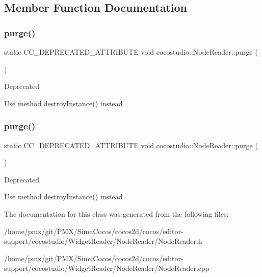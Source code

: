 \subsection{Member Function Documentation}
\mbox{\label{classcocostudio_1_1NodeReader_aac7a33c0697c91ac88c864f81f8813b3}} 
\subsubsection{\texorpdfstring{purge()}{purge()}\hspace{0.1cm}{\footnotesize\ttfamily [1/2]}}
{\footnotesize\ttfamily static C\+C\+\_\+\+D\+E\+P\+R\+E\+C\+A\+T\+E\+D\+\_\+\+A\+T\+T\+R\+I\+B\+U\+TE void cocostudio\+::\+Node\+Reader\+::purge (\begin{DoxyParamCaption}{ }\end{DoxyParamCaption})\hspace{0.3cm}{\ttfamily [static]}}

\begin{DoxyRefDesc}{Deprecated}
\item[\hyperlink{deprecated__deprecated000095}{Deprecated}]Use method destroy\+Instance() instead \end{DoxyRefDesc}
\mbox{\label{classcocostudio_1_1NodeReader_aac7a33c0697c91ac88c864f81f8813b3}} 
\subsubsection{\texorpdfstring{purge()}{purge()}\hspace{0.1cm}{\footnotesize\ttfamily [2/2]}}
{\footnotesize\ttfamily static C\+C\+\_\+\+D\+E\+P\+R\+E\+C\+A\+T\+E\+D\+\_\+\+A\+T\+T\+R\+I\+B\+U\+TE void cocostudio\+::\+Node\+Reader\+::purge (\begin{DoxyParamCaption}{ }\end{DoxyParamCaption})\hspace{0.3cm}{\ttfamily [static]}}

\begin{DoxyRefDesc}{Deprecated}
\item[\hyperlink{deprecated__deprecated000330}{Deprecated}]Use method destroy\+Instance() instead \end{DoxyRefDesc}


The documentation for this class was generated from the following files\+:\begin{DoxyCompactItemize}
\item 
/home/pmx/git/\+P\+M\+X/\+Simu\+Cocos/cocos2d/cocos/editor-\/support/cocostudio/\+Widget\+Reader/\+Node\+Reader/Node\+Reader.\+h\item 
/home/pmx/git/\+P\+M\+X/\+Simu\+Cocos/cocos2d/cocos/editor-\/support/cocostudio/\+Widget\+Reader/\+Node\+Reader/Node\+Reader.\+cpp\end{DoxyCompactItemize}
